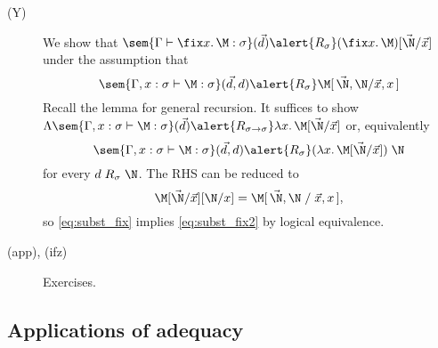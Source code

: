 \begin{frame}
  \begin{description}
    \item[(Y)] We show that
      $\sem{\Gamma \vdash \fix x.\, \M : \sigma}(\vec{d})
        \alert{\mathrel{R_\sigma}}
        (\fix x.\,\M)[\vec{\N}/\vec{x}]$
      under the assumption that
      \begin{equation}
        \label{eq:subst_fix}
        \sem{\Gamma, x : \sigma \vdash \M : \sigma}(\vec{d}, d)
        \alert{\mathrel{R_\sigma}}
        \M[\,\vec{\N}, \N/\vec{x}, x\,]
      \end{equation}
      Recall the lemma for general recursion. It suffices to show
      $\Lambda\sem{\Gamma, x : \sigma \vdash \M : \sigma}(\vec{d})
      \alert{\mathrel{R_{\sigma\to\sigma}}}
        \lambda x.\, \M[\vec{\N}/ \vec{x}] $
      or, equivalently 
      \begin{equation}
        \label{eq:subst_fix2}
        \sem{\Gamma, x : \sigma \vdash \M : \sigma}(\vec{d}, d)
        \alert{\mathrel{R_{\sigma}}}
        (\lambda x.\, \M[\vec{\N}/\vec{x}])\;\N
      \end{equation}
      for every $d \mathrel{R}_\sigma \N$.
      The RHS can be reduced to
      \[
        \M[\vec{\N}/\vec{x}][\N/x]
        = \M[\,\vec{\N}, \N\mathrel{/}\vec{x}, x\,],
      \]
      so \eqref{eq:subst_fix} implies 
      \eqref{eq:subst_fix2} by logical equivalence.
    \item[(app), (ifz)] Exercises. 
  \end{description}
\end{frame}

\subsection{Applications of adequacy}

